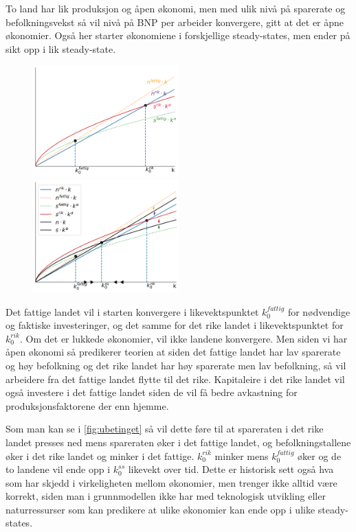 \documentclass[
  12pt,
  a4paper,
  DIV=11,
  numbers=noendperiod]{scrartcl}
\begin{document}
To land har lik produksjon og åpen økonomi, men med ulik nivå på
sparerate og befolkningsvekst så vil nivå på BNP per arbeider
konvergere, gitt at det er åpne økonomier. Også her starter økonomiene i
forskjellige steady-states, men ender på sikt opp i lik steady-state.

\begin{figure}
  \centering
  \includegraphics[width=0.5\textwidth]{ubetinget_konvergens.png}
  \label{fig:betinget}
  \includegraphics[width=0.5\textwidth]{betinget_konvergens.png}
  \label{fig:ubetinget}
  \vspace{-10mm}
\end{figure}

Det fattige landet vil i starten konvergere i likevektspunktet
\(k_0^{fattig}\) for nødvendige og faktiske investeringer, og det samme
for det rike landet i likevektspunktet for \(k_0^{rik}\). Om det er
lukkede økonomier, vil ikke landene konvergere. Men siden vi har åpen
økonomi så predikerer teorien at siden det fattige landet har lav
sparerate og høy befolkning og det rike landet har høy sparerate men lav
befolkning, så vil arbeidere fra det fattige landet flytte til det rike.
Kapitaleire i det rike landet vil også investere i det fattige landet
siden de vil få bedre avkastning for produksjonsfaktorene der enn
hjemme.

Som man kan se i \autoref{fig:ubetinget} så vil dette føre til at
spareraten i det rike landet presses ned mens spareraten øker i det
fattige landet, og befolkningstallene øker i det rike landet og minker i
det fattige. \(k_0^{rik}\) minker mens \(k_0^{fattig}\) øker og de to
landene vil ende opp i \(k_0^{ss}\) likevekt over tid. Dette er
historisk sett også hva som har skjedd i virkeligheten mellom økonomier,
men trenger ikke alltid være korrekt, siden man i grunnmodellen ikke har
med teknologisk utvikling eller naturressurser som kan predikere at
ulike økonomier kan ende opp i ulike steady-states.
\end{document}
